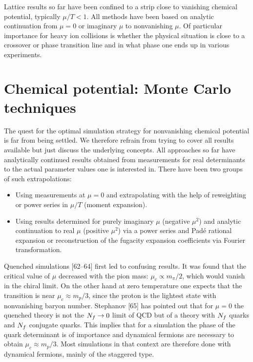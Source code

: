 Lattice results so far have been confined to a strip close to vanishing
chemical potential, typically $\mu/T < 1$. All methods have been based on
analytic continuation from $\mu = 0$ or imaginary $\mu$ to nonvanishing $\mu$.
Of particular importance for heavy ion collisions is whether the physical
situation is close to a crossover or phase transition line and in what phase
one ends up in various experiments.

\section{Chemical potential: Monte Carlo techniques}

The quest for the optimal simulation strategy for nonvanishing chemical
potential is far from being settled. We therefore refrain from trying to cover
all results available but just discuss the underlying concepts. All approaches
so far have analytically continued results obtained from measurements for real
determinants to the actual parameter values one is interested in. There have
been two groups of such extrapolations:
\begin{itemize}
  \item Using measurements at $\mu = 0$ and extrapolating with the help of
        reweighting or power series in $\mu/T$ (moment expansion).
  \item Using results determined for purely imaginary $\mu$ (negative $\mu^2$)
        and analytic continuation to real $\mu$ (positive $\mu^2$) via a power
        series and Pad\'e rational expansion or reconstruction of the fugacity
        expansion coefficients via Fourier transformation.
\end{itemize}

Quenched simulations [62--64] first led to confusing results. It was found that
the critical value of $\mu$ decreased with the pion mass: $\mu_c \propto
m_\pi/2$, which would vanish in the chiral limit. On the other hand at zero
temperature one expects that the transition is near $\mu_c \approx m_p/3$, since
the proton is the lightest state with nonvanishing baryon number. Stephanov
[65] has pointed out that for $\mu = 0$ the quenched theory is not the
$N_f \to 0$ limit of QCD but of a theory with $N_f$ quarks and $N_f$ conjugate
quarks. This implies that for a simulation the phase of the quark determinant
is of importance and dynamical fermions are necessary to obtain
$\mu_c \approx m_p/3$. Most simulations in that context are therefore done with
dynamical fermions, mainly of the staggered type.

